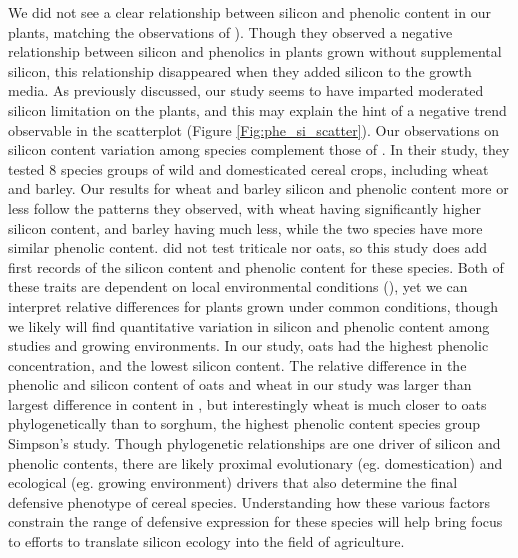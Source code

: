 \documentclass[12pt, letterpaper, ]{report}
\begin{document}
We did not see a clear relationship between silicon and phenolic content in our plants, matching the observations of \textcite{waterman_short-term_2021}). Though they observed a negative relationship between silicon and phenolics in plants grown without supplemental silicon, this relationship disappeared when they added silicon to the growth media. As previously discussed, our study seems to have imparted moderated silicon limitation on the plants, and this may explain the hint of a negative trend observable in the scatterplot (Figure \ref{Fig:phe_si_scatter}). Our observations on silicon content variation among species complement those of \textcite{simpson_still_2017}. In their study, they tested 8 species groups of wild and domesticated cereal crops, including wheat and barley. Our results for wheat and barley silicon and phenolic content more or less follow the patterns they observed, with wheat having significantly higher silicon content, and barley having much less, while the two species have more similar phenolic content. \textcite{simpson_still_2017} did not test triticale nor oats, so this study does add first records of the silicon content and phenolic content for these species. Both of these traits are dependent on local environmental conditions (\cite{quigley_soil_2020,schaller_silicon_2012}), yet we can interpret relative differences for plants grown under common conditions, though we likely will find quantitative variation in silicon and phenolic content among studies and growing environments. In our study, oats had the highest phenolic concentration, and the lowest silicon content. The relative difference in the phenolic and silicon content of oats and wheat in our study was larger than largest difference in content in \textcite{simpson_still_2017}, but interestingly wheat is much closer to oats phylogenetically than to sorghum, the highest phenolic content species group Simpson's study. Though phylogenetic relationships are one driver of silicon and phenolic contents, there are likely proximal evolutionary (eg. domestication) and ecological (eg. growing environment) drivers that also determine the final defensive phenotype of cereal species. Understanding how these various factors constrain the range of defensive expression for these species will help bring focus to efforts to translate silicon ecology into the field of agriculture. 
\end{document}

